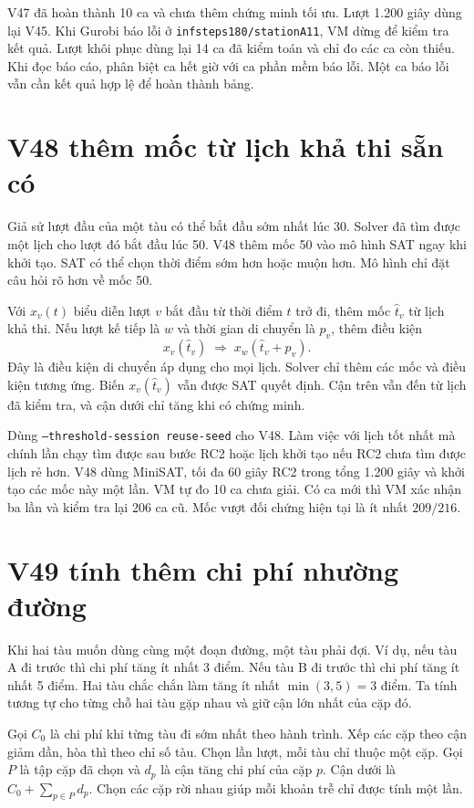 \documentclass[11pt,a4paper]{article}
\newcommand{\code}[1]{\texttt{#1}}
\begin{document}
V47 đã hoàn thành 10 ca và chưa thêm chứng minh tối ưu. Lượt
1.200 giây dùng lại V45. Khi Gurobi báo lỗi ở
\code{infsteps180/stationA11}, VM dừng để kiểm tra kết quả.
Lượt khôi phục dùng lại 14 ca đã kiểm toán và chỉ đo các ca
còn thiếu. Khi đọc báo cáo, phân biệt ca hết giờ với ca phần
mềm báo lỗi. Một ca báo lỗi vẫn cần kết quả hợp lệ để hoàn
thành bảng.

\section{V48 thêm mốc từ lịch khả thi sẵn có}

Giả sử lượt đầu của một tàu có thể bắt đầu sớm nhất lúc 30.
Solver đã tìm được một lịch cho lượt đó bắt đầu lúc 50. V48
thêm mốc 50 vào mô hình SAT ngay khi khởi tạo. SAT có thể
chọn thời điểm sớm hơn hoặc muộn hơn. Mô hình chỉ đặt câu
hỏi rõ hơn về mốc 50.

Với $x_v(t)$ biểu diễn lượt $v$ bắt đầu từ thời điểm $t$ trở
đi, thêm mốc $\hat t_v$ từ lịch khả thi. Nếu lượt kế tiếp
là $w$ và thời gian di chuyển là $p_v$, thêm điều kiện
\[
  x_v(\hat t_v) \;\Longrightarrow\; x_w(\hat t_v+p_v).
\]
Đây là điều kiện di chuyển áp dụng cho mọi lịch. Solver chỉ
thêm các mốc và điều kiện tương ứng. Biến $x_v(\hat t_v)$ vẫn
được SAT quyết định. Cận trên vẫn đến từ lịch đã kiểm tra,
và cận dưới chỉ tăng khi có chứng minh.

Dùng \code{--threshold-session reuse-seed} cho V48. Làm việc
với lịch tốt nhất mà chính lần chạy tìm được sau bước RC2
hoặc lịch khởi tạo nếu RC2 chưa tìm được lịch rẻ hơn. V48
dùng MiniSAT, tối đa 60 giây RC2 trong tổng 1.200 giây và
khởi tạo các mốc này một lần. VM tự đo 10 ca chưa giải. Có
ca mới thì VM xác nhận ba lần và kiểm tra lại 206 ca cũ.
Mốc vượt đối chứng hiện tại là ít nhất $209/216$.

\section{V49 tính thêm chi phí nhường đường}

Khi hai tàu muốn dùng cùng một đoạn đường, một tàu phải đợi.
Ví dụ, nếu tàu A đi trước thì chi phí tăng ít nhất 3 điểm.
Nếu tàu B đi trước thì chi phí tăng ít nhất 5 điểm. Hai tàu
chắc chắn làm tăng ít nhất $\min(3,5)=3$ điểm. Ta tính tương tự
cho từng chỗ hai tàu gặp nhau và giữ cận lớn nhất của cặp đó.

Gọi $C_0$ là chi phí khi từng tàu đi sớm nhất theo hành trình.
Xếp các cặp theo cận giảm dần, hòa thì theo chỉ số tàu. Chọn
lần lượt, mỗi tàu chỉ thuộc một cặp. Gọi $P$ là tập cặp đã
chọn và $d_p$ là cận tăng chi phí của cặp $p$. Cận dưới là
$C_0+\sum_{p\in P}d_p$. Chọn các cặp rời nhau giúp mỗi khoản
trễ chỉ được tính một lần.
\end{document}
